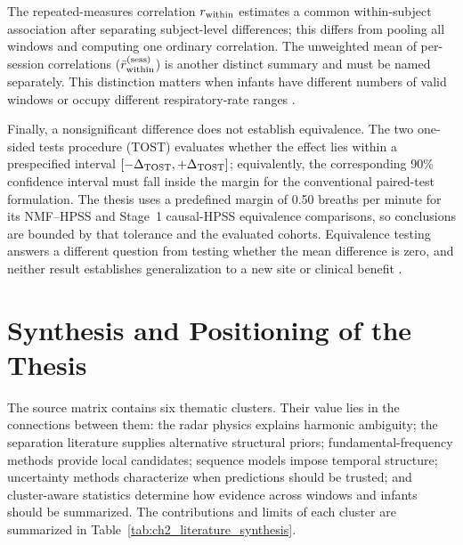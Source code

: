 The repeated-measures correlation $r_{\mathrm{within}}$ estimates a common within-subject association after
separating subject-level differences; this differs from pooling all windows and computing one
ordinary correlation. The unweighted mean of per-session correlations ($\bar{r}_{\mathrm{within}}^{(\mathrm{sess})}$) is
another distinct summary and must be named separately. This distinction matters when infants have
different numbers of valid windows or occupy different respiratory-rate ranges
\citep{bland1995calculating,bakdash2017repeated}.

Finally, a nonsignificant difference does not establish equivalence. The two one-sided tests
procedure (TOST) evaluates whether the effect lies within a prespecified interval
$[-\Delta_{\mathrm{TOST}},+\Delta_{\mathrm{TOST}}]$; equivalently, the corresponding 90\% confidence interval must
fall inside the margin for the conventional paired-test formulation. The thesis uses a
predefined margin of 0.50 breaths per minute for its NMF--HPSS and Stage~1 causal-HPSS equivalence
comparisons, so conclusions are bounded by that tolerance and the evaluated cohorts. Equivalence
testing answers a different question from testing whether the mean difference is zero, and neither
result establishes generalization to a new site or clinical benefit
\citep{schuirmann1987comparison,lakens2017equivalence}.

\section{Synthesis and Positioning of the Thesis}
\label{sec:ch2_synthesis}

The source matrix contains six thematic clusters. Their value lies in the connections between
them: the radar physics explains harmonic ambiguity; the separation literature supplies alternative
structural priors; fundamental-frequency methods provide local candidates; sequence models impose
temporal structure; uncertainty methods characterize when predictions should be trusted; and
cluster-aware statistics determine how evidence across windows and infants should be summarized.
The contributions and limits of each cluster are summarized in Table~\ref{tab:ch2_literature_synthesis}.

